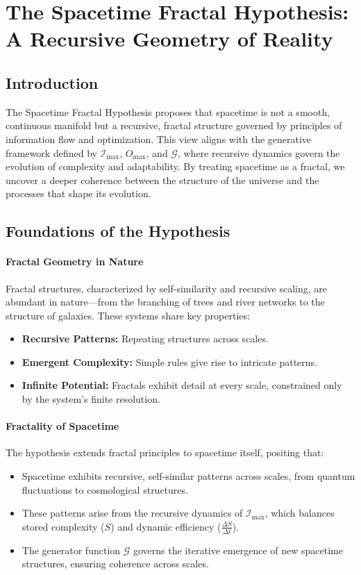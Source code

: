\documentclass[12pt]{article}
\begin{document}
\section{The Spacetime Fractal Hypothesis: A Recursive Geometry of Reality}

\subsection{Introduction}
The Spacetime Fractal Hypothesis proposes that spacetime is not a smooth, continuous manifold but a recursive, fractal structure governed by principles of information flow and optimization. This view aligns with the generative framework defined by \(\mathcal{I}_{\text{max}}\), \(O_{\text{max}}\), and \(\mathcal{G}\), where recursive dynamics govern the evolution of complexity and adaptability. By treating spacetime as a fractal, we uncover a deeper coherence between the structure of the universe and the processes that shape its evolution.

\subsection{Foundations of the Hypothesis}

\paragraph{Fractal Geometry in Nature}
Fractal structures, characterized by self-similarity and recursive scaling, are abundant in nature—from the branching of trees and river networks to the structure of galaxies. These systems share key properties:
\begin{itemize}
    \item \textbf{Recursive Patterns:} Repeating structures across scales.
    \item \textbf{Emergent Complexity:} Simple rules give rise to intricate patterns.
    \item \textbf{Infinite Potential:} Fractals exhibit detail at every scale, constrained only by the system’s finite resolution.
\end{itemize}

\paragraph{Fractality of Spacetime}
The hypothesis extends fractal principles to spacetime itself, positing that:
\begin{itemize}
    \item Spacetime exhibits recursive, self-similar patterns across scales, from quantum fluctuations to cosmological structures.
    \item These patterns arise from the recursive dynamics of \(\mathcal{I}_{\text{max}}\), which balances stored complexity (\(S\)) and dynamic efficiency (\(\frac{\Delta S}{\Delta t}\)).
    \item The generator function \(\mathcal{G}\) governs the iterative emergence of new spacetime structures, ensuring coherence across scales.
\end{itemize}
\end{document}
